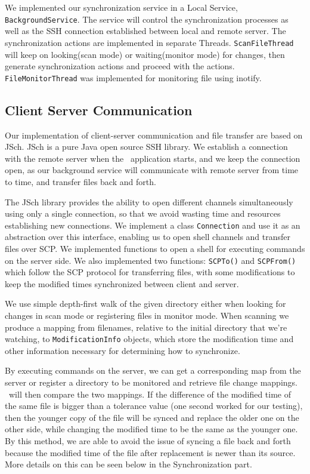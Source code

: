We implemented our synchronization service in a Local Service, \verb+BackgroundService+. The service will 
control the synchronization processes as well as the SSH connection established between local and remote server. The  
synchronization actions are implemented in separate Threads. \verb+ScanFileThread+ will keep on looking(scan mode) or 
waiting(monitor mode) for changes, then generate synchronization actions and proceed with the actions. \verb+FileMonitorThread+ was implemented for monitoring file using inotify.

\subsection{Client Server Communication}
Our implementation of client-server communication and file transfer are based on JSch. JSch is a pure Java open source SSH library. We establish a connection with the remote server when the \teledroid\ application starts, and we keep the connection open, as our background service will communicate with remote server from time to time, and transfer files back and forth. 

The JSch library provides the ability to open different channels simultaneously using only a single connection, so that we avoid 
wasting time and resources establishing new connections. We implement a class \verb+Connection+ and use it as an abstraction over this interface, enabling us to open shell channels and transfer files over SCP. We implemented functions to open 
a shell for executing commands on the server side.  
We also implemented two functions: \verb+SCPTo()+ and \verb+SCPFrom()+ which follow the SCP protocol for transferring files, with some modifications to keep the modified times synchronized between client and server. 

We use simple depth-first walk of the given directory either when looking for changes in scan mode or registering files in monitor mode. When scanning we produce a mapping from filenames, relative to the initial directory that we're watching, to \verb+ModificationInfo+ objects, which store the modification time and other information necessary for determining how to synchronize.

By executing commands on the server, we can get a corresponding map from the server or register a directory to be monitored  and retrieve file change mappings. \teledroid\ will then compare the two mappings. If the difference of the modified time of the same file is bigger than a tolerance value (one second worked for our testing), then the younger copy of the file will be synced and replace the older one on the other side, while changing the modified time to be the same as the younger one. By this method, we are able to avoid the issue of syncing a file back and forth because the modified time of the file after replacement is newer than its source. More details on this can be seen below in the Synchronization part.

